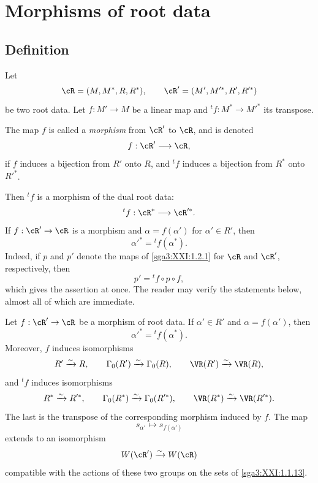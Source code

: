 \section{Morphisms of root data}\label{sga3:XXI:6}
\renewcommand{\thetheorem}{\thesubsection.\arabic{theorem}}

\subsection{Definition}\label{sga3:XXI:6.1}

Let
\[
 \cR=(M,M^\ast,R,R^\ast),
 \qquad
 \cR'=(M',M'^\ast,R',R'^\ast)
\]
be two root data. Let \(f:M'\to M\) be a linear map and
\({}^tf:M^\ast\to M'^\ast\) its transpose.

\begin{definition}\label{sga3:XXI:6.1.1}
The map \(f\) is called a \emph{morphism} from \(\cR'\) to \(\cR\),
and is denoted
\[
 f:\cR'\longrightarrow\cR,
\]
if \(f\) induces a bijection from \(R'\) onto \(R\), and
\({}^tf\) induces a bijection from \(R^\ast\) onto \(R'^\ast\).
\end{definition}

Then \({}^tf\) is a morphism of the dual root data:
\[
 {}^tf:\cR^\ast\longrightarrow\cR'^\ast.
\]
If \(f:\cR'\to\cR\) is a morphism and
\(\alpha=f(\alpha')\) for \(\alpha'\in R'\), then
\[
 \alpha'^\ast={}^tf(\alpha^\ast).
\]
Indeed, if \(p\) and \(p'\) denote the maps of
\ref{sga3:XXI:1.2.1} for \(\cR\) and \(\cR'\), respectively, then
\[
 p'={}^tf\circ p\circ f,
\]
which gives the assertion at once. The reader may verify the
statements below, almost all of which are immediate.

\begin{proposition}\label{sga3:XXI:6.1.2}
Let \(f:\cR'\to\cR\) be a morphism of root data. If
\(\alpha'\in R'\) and \(\alpha=f(\alpha')\), then
\[
 \alpha'^\ast={}^tf(\alpha^\ast).
\]
Moreover, \(f\) induces isomorphisms
\[
 R'\xrightarrow{\sim}R,\qquad
 \Gamma_0(R')\xrightarrow{\sim}\Gamma_0(R),\qquad
 \VR(R')\xrightarrow{\sim}\VR(R),
\]
and \({}^tf\) induces isomorphisms
\[
 R^\ast\xrightarrow{\sim}R'^\ast,\qquad
 \Gamma_0(R^\ast)\xrightarrow{\sim}\Gamma_0(R'^\ast),\qquad
 \VR(R^\ast)\xrightarrow{\sim}\VR(R'^\ast).
\]
The last is the transpose of the corresponding morphism induced by
\(f\). The map
\[
 s_{\alpha'}\longmapsto s_{f(\alpha')}
\]
extends to an isomorphism
\[
 W(\cR')\xrightarrow{\sim}W(\cR)
\]
compatible with the actions of these two groups on the sets of
\ref{sga3:XXI:1.1.13}.
\end{proposition}

